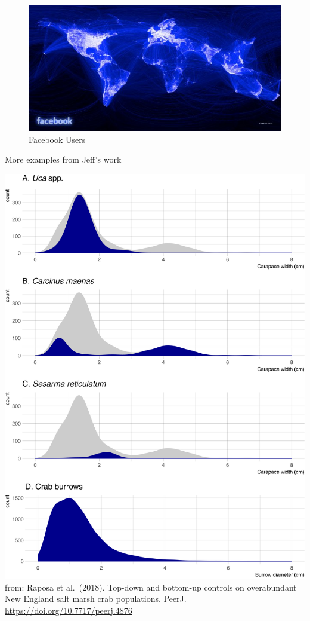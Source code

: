 \documentclass[]{article}
\begin{document}
\begin{figure}
\centering
\includegraphics{figures/FbMap.jpg}
\caption{Facebook Users}
\end{figure}

More examples from Jeff's work

\includegraphics{figures/fig-2-full.png} from: Raposa et al.~(2018).
Top-down and bottom-up controls on overabundant New England salt marsh
crab populations. PeerJ. \url{https://doi.org/10.7717/peerj.4876}
\end{document}
